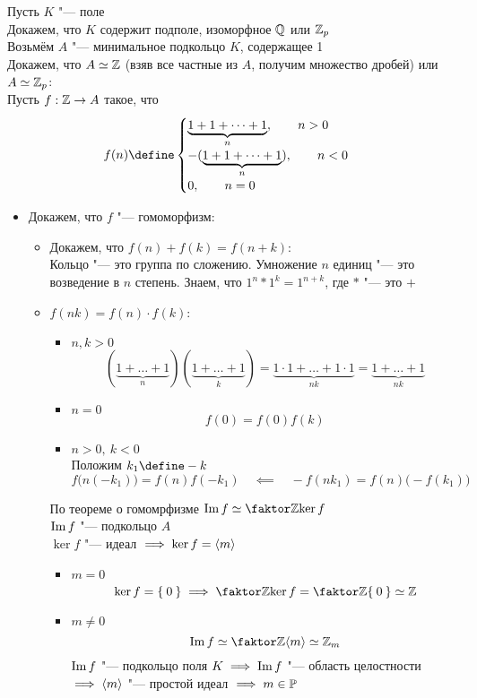 \begin{eproof}
	\item Пусть $ K $ "--- поле \\
	Докажем, что $ K $ содержит подполе, изоморфное $ \mathbb{Q} $ или $ \mathbb{Z}_p $ \\
	Возьмём $ A $ "--- минимальное подкольцо $ K $, содержащее 1 \\
	Докажем, что $ A \simeq \mathbb{Z} $ (взяв все частные из $ A $, получим множество дробей) или $ A \simeq \mathbb{Z}_p $: \\
	Пусть $ f : \mathbb{Z} \to A $ такое, что
	$$ f(n) \define
	\begin{cases}
		\underbrace{1 + 1 + \dots + 1}_n, \qquad n > 0 \\
		-(\underbrace{1 + 1 + \dots + 1}_n), \qquad n < 0 \\
		0, \qquad n = 0
	\end{cases} $$
	\begin{itemize}
		\item Докажем, что $ f $ "--- гомоморфизм:
		\begin{itemize}
			\item Докажем, что $ f(n) + f(k) = f(n + k) $: \\
			Кольцо "--- это группа по сложению. Умножение $ n $ единиц "--- это возведение в $ n $ степень. Знаем, что $ 1^n * 1^k = 1^{n + k} $, где $ * $ "--- это $ + $
			\item $ f(nk) = f(n) \cdot f(k) $:
			\begin{itemize}
				\item $ n, k > 0 $
				$$ (\underbrace{1 + \dots + 1}_n)(\underbrace{1 + \dots + 1}_k) = \underbrace{1 \cdot 1 + \dots + 1 \cdot 1}_{nk} = \underbrace{1 + \dots + 1}_{nk} $$
				\item $ n = 0 $
				$$ f(0) = f(0) f(k) $$
				\item $ n > 0, ~ k < 0 $ \\
				Положим $ k_1 \define -k $
				$$ f \bigg( n(-k_1) \bigg) = f(n) f(-k_1) \quad \impliedby \quad -f(nk_1) = f(n) \bigg( -f(k_1) \bigg) $$
			\end{itemize}
			По теореме о гомомрфизме $ \Img f \simeq \faktor\Z{\ker f} $ \\
			$ \operatorname{Im} f $ "--- подкольцо $ A $ \\
			$ \ker f $ "--- идеал $ \implies \ker f = \Braket m $
			\begin{itemize}
				\item $ m = 0 $
				$$ \ker f = \set0 \implies \faktor\Z{\ker f} = \faktor\Z{\set0} \simeq \Z $$
				\item $ m \ne 0 $
				$$ \Img f \simeq \faktor\Z{\braket m} \simeq \Z_m $$
				$ \operatorname{Im} f $ "--- подкольцо поля $ K \implies \operatorname{Im} f $ "--- область целостности \\
				$ \implies \Braket m $ "--- простой идеал $ \implies m \in \mathbb{P} $
			\end{itemize}
		\end{itemize}
	\end{itemize}
\end{eproof}

